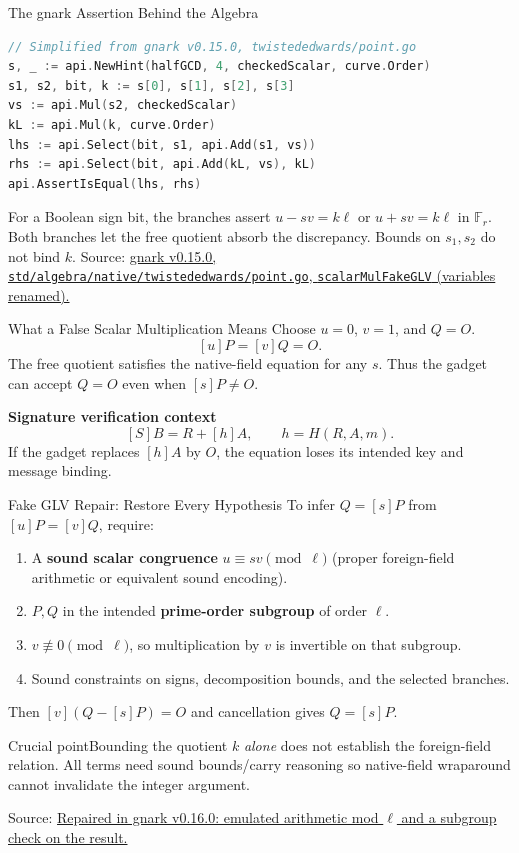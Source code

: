 \documentclass[aspectratio=169,11pt]{beamer}
\newcommand{\F}{\mathbb F}
\newcommand{\src}[2]{\vfill{\tiny\color{gray}Source: \href{#1}{#2}}}
\begin{document}
\begin{frame}[fragile]{The gnark Assertion Behind the Algebra}
\begin{lstlisting}[language=Go,basicstyle=\ttfamily\footnotesize]
// Simplified from gnark v0.15.0, twistededwards/point.go
s, _ := api.NewHint(halfGCD, 4, checkedScalar, curve.Order)
s1, s2, bit, k := s[0], s[1], s[2], s[3]
vs := api.Mul(s2, checkedScalar)
kL := api.Mul(k, curve.Order)
lhs := api.Select(bit, s1, api.Add(s1, vs))
rhs := api.Select(bit, api.Add(kL, vs), kL)
api.AssertIsEqual(lhs, rhs)
\end{lstlisting}
For a Boolean sign bit, the branches assert $u-sv=k\ell$ or $u+sv=k\ell$ in $\F_r$.
\vspace{2mm}Both branches let the free quotient absorb the discrepancy. Bounds on $s_1,s_2$ do not bind $k$.
\src{https://github.com/Consensys-Incorporated/gnark/blob/v0.15.0/std/algebra/native/twistededwards/point.go\#L129-L182}{gnark v0.15.0, \texttt{std/algebra/native/twistededwards/point.go}, \texttt{scalarMulFakeGLV} (variables renamed).}
\end{frame}

\begin{frame}{What a False Scalar Multiplication Means}
Choose $u=0$, $v=1$, and $Q=O$.
\[[u]P=[v]Q=O.\]
The free quotient satisfies the native-field equation for any $s$.
Thus the gadget can accept $Q=O$ even when $[s]P\ne O$.
\par\vspace{4mm}\textbf{Signature verification context}
\[[S]B=R+[h]A,\qquad h=H(R,A,m).\]
If the gadget replaces $[h]A$ by $O$, the equation loses its intended key and message binding.
\end{frame}

\begin{frame}{Fake GLV Repair: Restore Every Hypothesis}
To infer $Q=[s]P$ from $[u]P=[v]Q$, require:
\begin{enumerate}
\item A \textbf{sound scalar congruence} $u\equiv sv\pmod\ell$ (proper foreign-field arithmetic or equivalent sound encoding).
\item $P,Q$ in the intended \textbf{prime-order subgroup} of order $\ell$.
\item $v\not\equiv0\pmod\ell$, so multiplication by $v$ is invertible on that subgroup.
\item Sound constraints on signs, decomposition bounds, and the selected branches.
\end{enumerate}
\vspace{1mm}
Then $[v](Q-[s]P)=O$ and cancellation gives $Q=[s]P$.
\begin{block}{Crucial point}Bounding the quotient $k$ \emph{alone} does not establish the foreign-field relation. All terms need sound bounds/carry reasoning so native-field wraparound cannot invalidate the integer argument.\end{block}
\src{https://github.com/Consensys-Incorporated/gnark/blob/v0.16.0/std/algebra/native/twistededwards/scalar_decomp.go}{Repaired in gnark v0.16.0: emulated arithmetic mod $\ell$ and a subgroup check on the result.}
\end{frame}
\end{document}
